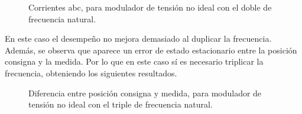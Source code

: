 \documentclass[a4paper, 10pt, onecolumn,journal]{ieeeconf}
\begin{document}
\begin{figure}[H]
	\centering
	\begin{adjustbox}{scale=0.55,max width=\columnwidth}
	\end{adjustbox}
	\caption{Corrientes abc, para modulador de tensión no ideal con el doble de frecuencia natural.}
	\label{Corrientes abc, para modulador de tensión no ideal con el doble de frecuencia natural}
\end{figure}
En este caso el desempeño no mejora demasiado al duplicar la frecuencia. Además, se observa que aparece un error de estado estacionario entre la posición consigna y la medida. Por lo que en este caso sí es necesario triplicar la frecuencia, obteniendo los siguientes resultados.
\begin{figure}[H]
	\centering
	\begin{adjustbox}{scale=0.58,max width=\columnwidth}
	\end{adjustbox}
	\caption{Diferencia entre posición consigna y medida, para modulador de tensión no ideal con el triple de frecuencia natural.}
	\label{Diferencia entre posición consigna y medida, para modulador de tensión no ideal con el triple de frecuencia natural}
\end{figure}
\end{document}
